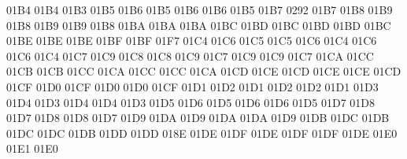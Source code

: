 \setcclcucx 01B4 01B4 01B3 %
\setcclcucx 01B5 01B6 01B5 %
\setcclcucx 01B6 01B6 01B5 %
\setcclcucx 01B7 0292 01B7 %
\setcclcucx 01B8 01B9 01B8 %
\setcclcucx 01B9 01B9 01B8 %
\setcclcucx 01BA 01BA 01BA %
\setcclcucx 01BC 01BD 01BC %
\setcclcucx 01BD 01BD 01BC %
\setcclcucx 01BE 01BE 01BE %
\setcclcucx 01BF 01BF 01F7 %
\setcclcucx 01C4 01C6 01C5 %
\setcclcucx 01C5 01C6 01C4 %
\setcclcucx 01C6 01C6 01C4 %
\setcclcucx 01C7 01C9 01C8 %
\setcclcucx 01C8 01C9 01C7 %
\setcclcucx 01C9 01C9 01C7 %
\setcclcucx 01CA 01CC 01CB %
\setcclcucx 01CB 01CC 01CA %
\setcclcucx 01CC 01CC 01CA %
\setcclcucx 01CD 01CE 01CD %
\setcclcucx 01CE 01CE 01CD %
\setcclcucx 01CF 01D0 01CF %
\setcclcucx 01D0 01D0 01CF %
\setcclcucx 01D1 01D2 01D1 %
\setcclcucx 01D2 01D2 01D1 %
\setcclcucx 01D3 01D4 01D3 %
\setcclcucx 01D4 01D4 01D3 %
\setcclcucx 01D5 01D6 01D5 %
\setcclcucx 01D6 01D6 01D5 %
\setcclcucx 01D7 01D8 01D7 %
\setcclcucx 01D8 01D8 01D7 %
\setcclcucx 01D9 01DA 01D9 %
\setcclcucx 01DA 01DA 01D9 %
\setcclcucx 01DB 01DC 01DB %
\setcclcucx 01DC 01DC 01DB %
\setcclcucx 01DD 01DD 018E %
\setcclcucx 01DE 01DF 01DE %
\setcclcucx 01DF 01DF 01DE %
\setcclcucx 01E0 01E1 01E0 %
